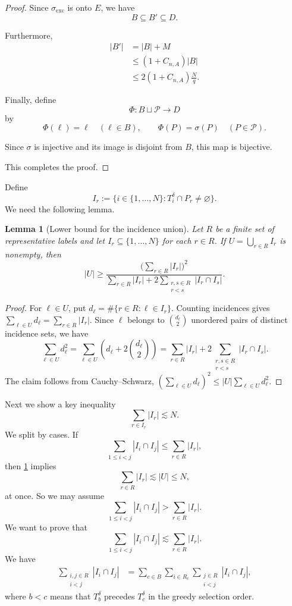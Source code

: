 \documentclass[11pt, letterpaper]{nyjm}
\newtheorem{lemma}[theorem]{Lemma}
\begin{document}
\begin{proof}
		Since $\sigma_{\mathrm{exc}}$ is onto $E$,
		we have
		\[
		B\subseteq B'\subseteq D.
		\]
		
		Furthermore,
		\[
		\begin{aligned}
			|B'|
			&=|B|+M\\
			&\le(1+C_{n,A})|B|\\
			&\le2(1+C_{n,A})\frac Nq.
		\end{aligned}
		\]
		
		Finally, define
		\[
		\Phi:B\sqcup\mathcal P\longrightarrow D
		\]
		by
		\[
		\Phi(\ell)=\ell\quad(\ell\in B),
		\qquad
		\Phi(P)=\sigma(P)\quad(P\in\mathcal P).
		\]
		
		Since $\sigma$ is injective and its
		image is disjoint from $B$, this
		map is bijective.
		
		This completes the proof.
	\end{proof}
	Define
	\[
	I_r:=\{i\in\{1,\ldots,N\}: T_i^\delta\cap P_r \ne\varnothing\}.
	\]
	We need the following lemma.
	 \begin{lemma}[Lower bound for the incidence union]
	 	\label{lem:incidence-union-lower-bound}
	 	Let $R$ be a finite set of representative labels and let
	 	$I_r\subseteq\{1,\ldots,N\}$ for each $r\in R$. If
	 	$U=\bigcup_{r\in R}I_r$ is nonempty, then
	 	\[
	 	|U|\ge
	 	\frac{\bigl(\sum_{r\in R}|I_r|\bigr)^2}
	 	{\displaystyle\sum_{r\in R}|I_r|
	 		+2\sum_{\substack{r,s\in R\\r<s}}|I_r\cap I_s|}.
	 	\]
	 \end{lemma}
	 
	 \begin{proof}
	 	For $\ell\in U$, put $d_\ell=\#\{r\in R:\ell\in I_r\}$.
	 	Counting incidences gives $\sum_{\ell\in U}d_\ell=\sum_{r\in R}|I_r|$.
	 	Since $\ell$ belongs to $\binom{d_\ell}{2}$ unordered pairs of
	 	distinct incidence sets, we have
	 	\[
	 	\sum_{\ell\in U}d_\ell^2
	 	=\sum_{\ell\in U}\left(d_\ell+2\binom{d_\ell}{2}\right)
	 	=\sum_{r\in R}|I_r|+2\sum_{\substack{r,s\in R\\r<s}}|I_r\cap I_s|.
	 	\]
	 	The claim follows from Cauchy--Schwarz,
	 	$(\sum_{\ell\in U}d_\ell)^2\le |U|\sum_{\ell\in U}d_\ell^2$.
	 \end{proof}
		 
Next we show a key inequality
\begin{equation} \label{eq:key-bound}
	\sum_{r \in I_r}|I_r| \lesssim N.
\end{equation}
We split by cases. 
If
\[
\sum_{1\leq i < j} |I_i \cap I_j| \leq \sum_{r\in R}|I_r|, 
\]
then 
\ref{lem:incidence-union-lower-bound} implies 
\[
\sum_{r\in R}|I_r| \lesssim |U| \leq N, 
\]
at once.
So we may assume
\[
\sum_{1\leq i < j} |I_i \cap I_j| > \sum_{r\in R}|I_r|. 
\]
We want to prove that 
\[
\sum_{1\leq i < j} |I_i \cap I_j| \lesssim \sum_{r\in R}|I_r|. 
\]
We have
\begin{align*}
	\sum_{\substack{i,j\in R\\ i<j}} |I_i\cap I_j|
	&=
	\sum_{c \in B}\sum_{i\in R_c}\sum_{\substack{j\in R\\ i <j}} |I_i\cap I_j|
	,
\end{align*}
where $b<c$ means that $T_b^\delta$ precedes $T_c^\delta$ in the greedy
selection order.
\end{document}
